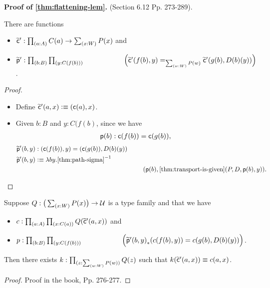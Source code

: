 \documentclass[centering]{report}
\newenvironment{slide}
    {\newpage
    \vspace*{\fill}
    }
    {
     \vspace*{\fill}
    }
\begin{document}
\begin{slide}
\textbf{Proof of \cref{thm:flattening-lem}.} (Section 6.12 Pp. 273-289).
\begin{lem}\label{thm:flattening-cp}
  There are functions
  \begin{itemize}
  \item $\cct':\prd{a:A} C(a) \to \sm{x:W} P(x)$ and
  \item $\ppt':\prd{b:B}{y:C(f(b))} \\\hspace*{20mm}
   \Big(\cct'(f(b),y)=_{\sm{w:W}P(w)}\cct'(g(b),D(b)(y))\Big)$.
  \end{itemize}
\end{lem}
\begin{proof}\hspace{5cm}
  \begin{itemize}
    \item Define $\widetilde{\mathsf{c}}'(a,x) \vcentcolon\equiv (\mathsf{c}(a),x)$.
    \item
Given  $b:B$ and $y:C(f(b)$, since we have
\begin{align*}
\mathsf{p}(b):\mathsf{c}(f(b))=\mathsf{c}(g(b)),
\end{align*}
\begin{align*}
 &\ppt'(b,y) : (\cc(f(b)),y) = (\cc(g(b)),D(b)(y))\\
 &\ppt'(b,y) \defeq \lambda b y.\opp{\text{\cref{thm:path-sigma}}}\\
  &\hspace{70mm}(\pp(b), \cref{thm:transport-is-given}(P,D,\pp(b),y)).
\end{align*}
  \end{itemize}
\end{proof}
\end{slide}

\begin{slide}
\begin{lem}\label{thm:flattening-rect}
  Suppose $Q:\big(\sm{x:W} P(x)\big) \to \type$ is a type family and that we have\\[2mm]
  \begin{itemize}
  \item $c : \prd{a:A}{x:C(a)} Q(\cct'(a,x))$ and
  \item $p : \prd{b:B}{y:C(f(b))}\\
  \hspace*{20mm}\Big(\trans{\ppt'(b,y)}{c(f(b),y)} = c(g(b),D(b)(y))\Big)$. %
  \end{itemize}
  \vspace*{2mm}
  Then there exists $k:\prd{z:\sm{w:W} P(w)} Q(z)$ such that $k(\widetilde{\mathsf{c}}'(a,x)) \equiv c(a,x)$.
\end{lem}
\begin{proof} Proof in the book, Pp. 276-277.
\end{proof}
\end{slide}
\end{document}
